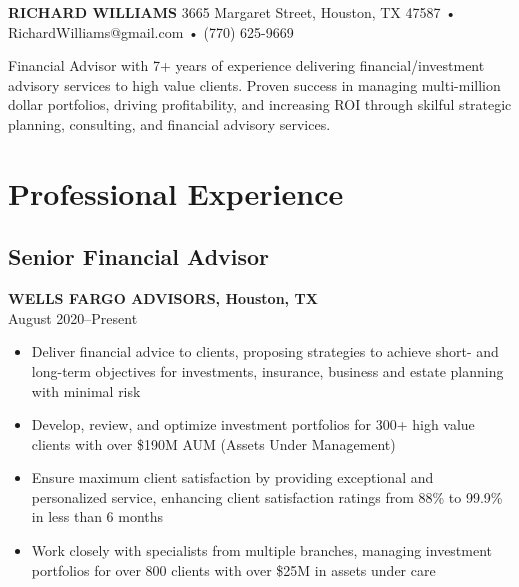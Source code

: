 \documentclass[11pt,a4paper]{article}
\newcommand{\resumeItem}[1]{\item #1}
\begin{document}
{\huge\bfseries\color{headingcolor} RICHARD WILLIAMS}
{\small
3665 Margaret Street, Houston, TX 47587 • RichardWilliams@gmail.com • (770) 625-9669
}

\noindent{\color{headingcolor}\rule{\linewidth}{0.4pt}}

{\small Financial Advisor with 7+ years of experience delivering financial/investment advisory services to high value clients. Proven success in managing multi-million dollar portfolios, driving profitability, and increasing ROI through skilful strategic planning, consulting, and financial advisory services.}

\section{Professional Experience}

\subsection{Senior Financial Advisor}
\vspace{-0.5em}
\textbf{WELLS FARGO ADVISORS, Houston, TX}\\
August 2020--Present
\vspace{-0.5em}
\begin{itemize}
    \resumeItem{Deliver financial advice to clients, proposing strategies to achieve short- and long-term objectives for investments, insurance, business and estate planning with minimal risk}
    \resumeItem{Develop, review, and optimize investment portfolios for 300+ high value clients with over \$190M AUM (Assets Under Management)}
    \resumeItem{Ensure maximum client satisfaction by providing exceptional and personalized service, enhancing client satisfaction ratings from 88\% to 99.9\% in less than 6 months}
    \resumeItem{Work closely with specialists from multiple branches, managing investment portfolios for over 800 clients with over \$25M in assets under care}
\end{itemize}

\end{document}
